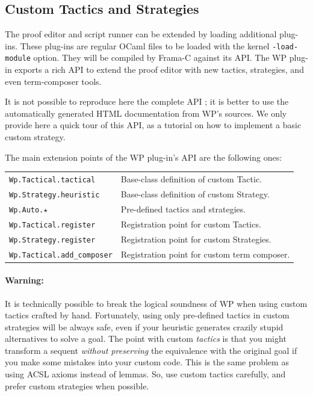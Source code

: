 \subsection{Custom Tactics and Strategies}
\label{wp-custom-tactics}

The proof editor and script runner can be extended by loading additional plug-ins. These plug-ins are regular OCaml files to be loaded with the kernel \texttt{-load-module} option. They will be compiled by \textsf{Frama-C} against its API. The \textsf{WP} plug-in exports a rich API to extend the proof editor with new tactics, strategies, and even term-composer tools.

It is not possible to reproduce here the complete API ; it is better to use the automatically generated HTML documentation from \textsf{WP}'s sources. We only provide here a quick tour of this API, as a tutorial on how to implement a basic custom strategy.

The main extension points of the \textsf{WP} plug-in's API are the following ones:
\begin{center}
    \begin{tabular}{ll}
    \hline
    \texttt{Wp.Tactical.tactical} & Base-class definition of custom Tactic. \\
    \texttt{Wp.Strategy.heuristic} & Base-class definition of custom Strategy. \\
    \hline
    \texttt{Wp.Auto.$\star$} & Pre-defined tactics and strategies. \\
    \texttt{Wp.Tactical.register} & Registration point for custom Tactics. \\
    \texttt{Wp.Strategy.register} & Registration point for custom Strategies. \\
    \texttt{Wp.Tactical.add\_composer} & Registration point for custom term composer. \\
    \hline
    \end{tabular}
\end{center}

\paragraph{Warning:} It is technically possible to break the logical soundness of \textsf{WP} when using custom tactics crafted by hand. Fortunately, using only pre-defined tactics in custom strategies will be always safe, even if your heuristic generates crazily stupid alternatives to solve a goal. The point with custom \emph{tactics} is that you might transform a sequent \emph{without preserving} the equivalence with the original goal if you make some mistakes into your custom code. This is the same problem as using \textsf{ACSL} axioms instead of lemmas. So, use custom tactics carefully, and prefer custom strategies when possible.

